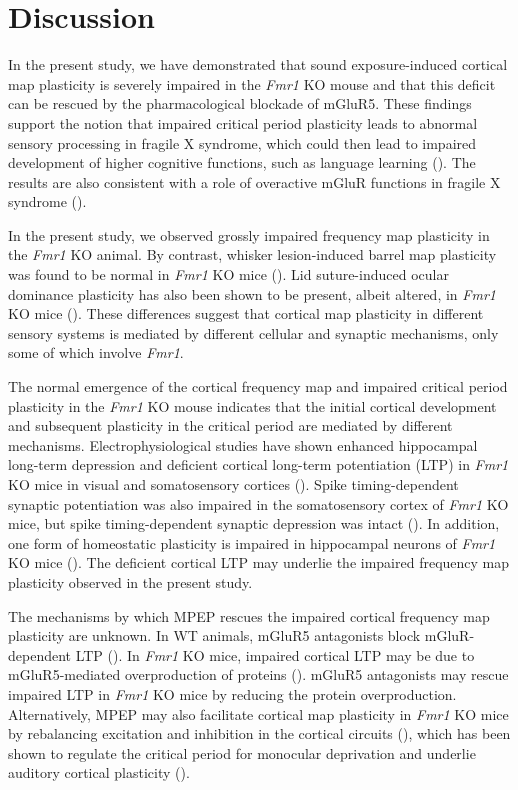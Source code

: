 \section{Discussion}

In the present study, we have demonstrated that sound exposure-induced cortical map plasticity is severely impaired in the \textit{Fmr1} KO mouse and that this deficit can be rescued by the pharmacological blockade of mGluR5. These findings support the notion that impaired critical period plasticity leads to abnormal sensory processing in fragile X syndrome, which could then lead to impaired development of higher cognitive functions, such as language learning (\cite{Leblanc2011}). The results are also consistent with a role of overactive mGluR functions in fragile X syndrome (\cite{Bear2004, Dolen2007}).

In the present study, we observed grossly impaired frequency map plasticity in the \textit{Fmr1} KO animal. By contrast, whisker lesion-induced barrel map plasticity was found to be normal in \textit{Fmr1} KO mice (\cite{Harlow2010a}). Lid suture-induced ocular dominance plasticity has also been shown to be present, albeit altered, in \textit{Fmr1} KO mice (\cite{Dolen2007}). These differences suggest that cortical map plasticity in different sensory systems is mediated by different cellular and synaptic mechanisms, only some of which involve \textit{Fmr1}.

The normal emergence of the cortical frequency map and impaired critical period plasticity in the \textit{Fmr1} KO mouse indicates that the initial cortical development and subsequent plasticity in the critical period are mediated by different mechanisms. Electrophysiological studies have shown enhanced hippocampal long-term depression and deficient cortical long-term potentiation (LTP) in \textit{Fmr1} KO mice in visual and somatosensory cortices (\cite{Li2002, Zhao2005, Wilson2007}). Spike timing-dependent synaptic potentiation was also impaired in the somatosensory cortex of \textit{Fmr1} KO mice, but spike timing-dependent synaptic depression was intact (\cite{Desai2006, Meredith2007}). In addition, one form of homeostatic plasticity is impaired in hippocampal neurons of \textit{Fmr1} KO mice (\cite{Soden2010}). The deficient cortical LTP may underlie the impaired frequency map plasticity observed in the present study.

The mechanisms by which MPEP rescues the impaired cortical frequency map plasticity are unknown. In WT animals, mGluR5 antagonists block mGluR-dependent LTP (\cite{Wang2003, Wilson2007}). In \textit{Fmr1} KO mice, impaired cortical LTP may be due to mGluR5-mediated overproduction of proteins (\cite{Dolen2007, Dolen2008}). mGluR5 antagonists may rescue impaired LTP in \textit{Fmr1} KO mice by reducing the protein overproduction. Alternatively, MPEP may also facilitate cortical map plasticity in \textit{Fmr1} KO mice by rebalancing excitation and inhibition in the cortical circuits (\cite{Chuang2005, Selby2007, Curia2009}), which has been shown to regulate the critical period for monocular deprivation and underlie auditory cortical plasticity (\cite{Hensch2004, Dorrn2010}).

